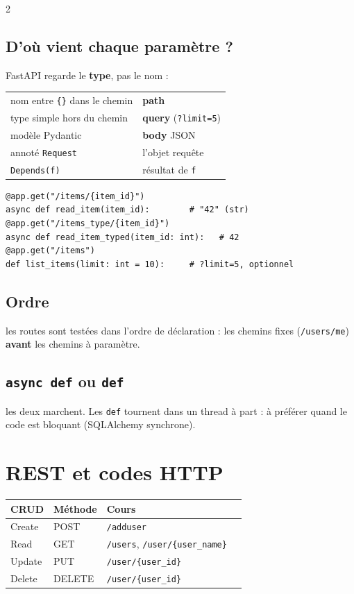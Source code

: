 \documentclass[a4paper,10pt]{article}
\newcommand{\co}[1]{\texttt{\textcolor{codefg}{#1}}}
\begin{document}
\begin{multicols}{2}
\subsection{D'où vient chaque paramètre ?} FastAPI regarde le
\textbf{type}, pas le nom :

\begin{tabularx}{\linewidth}{@{}l>{\raggedright\arraybackslash}X@{}}
\toprule
nom entre \co{\{\}} dans le chemin & \textbf{path} \\
type simple hors du chemin         & \textbf{query} (\co{?limit=5}) \\
modèle Pydantic                    & \textbf{body} JSON \\
annoté \co{Request}                & l'objet requête \\
\co{Depends(f)}                    & résultat de \co{f} \\
\bottomrule
\end{tabularx}

\vspace{0.3em}
\begin{lstlisting}
@app.get("/items/{item_id}")
async def read_item(item_id):        # "42" (str)
@app.get("/items_type/{item_id}")
async def read_item_typed(item_id: int):   # 42
@app.get("/items")
def list_items(limit: int = 10):     # ?limit=5, optionnel
\end{lstlisting}

\subsection{Ordre} les routes sont testées dans l'ordre de déclaration :
les chemins fixes (\co{/users/me}) \textbf{avant} les chemins à paramètre.

\subsection{\co{async def} ou \co{def}} les deux marchent. Les \co{def}
tournent dans un thread à part : à préférer quand le code est bloquant
(SQLAlchemy synchrone).

\section{REST et codes HTTP}

\begin{tabularx}{\linewidth}{@{}lll>{\raggedright\arraybackslash}X@{}}
\toprule
\textbf{CRUD} & \textbf{Méthode} & \textbf{Cours} \\
\midrule
Create & POST   & \co{/adduser} \\
Read   & GET    & \co{/users}, \co{/user/\{user\_name\}} \\
Update & PUT    & \co{/user/\{user\_id\}} \\
Delete & DELETE & \co{/user/\{user\_id\}} \\
\bottomrule
\end{tabularx}


\end{multicols}
\end{document}
